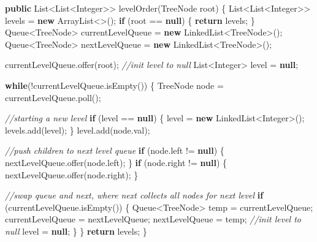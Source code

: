\documentclass[]{book}
\newenvironment{Shaded}{\begin{snugshade}}{\end{snugshade}}
\newcommand{\BuiltInTok}[1]{#1}
\newcommand{\CommentTok}[1]{\textcolor[rgb]{0.56,0.35,0.01}{\textit{#1}}}
\newcommand{\FunctionTok}[1]{\textcolor[rgb]{0.00,0.00,0.00}{#1}}
\newcommand{\KeywordTok}[1]{\textcolor[rgb]{0.13,0.29,0.53}{\textbf{#1}}}
\newcommand{\NormalTok}[1]{#1}
\begin{document}
\begin{Shaded}
\begin{Highlighting}[]
\KeywordTok{public} \BuiltInTok{List}\NormalTok{<}\BuiltInTok{List}\NormalTok{<}\BuiltInTok{Integer}\NormalTok{>> }\FunctionTok{levelOrder}\NormalTok{(}\BuiltInTok{TreeNode}\NormalTok{ root) \{}
    \BuiltInTok{List}\NormalTok{<}\BuiltInTok{List}\NormalTok{<}\BuiltInTok{Integer}\NormalTok{>> levels = }\KeywordTok{new} \BuiltInTok{ArrayList}\NormalTok{<>();}
    \KeywordTok{if}\NormalTok{ (root == }\KeywordTok{null}\NormalTok{) \{}
        \KeywordTok{return}\NormalTok{ levels;}
\NormalTok{    \}}
    \BuiltInTok{Queue}\NormalTok{<}\BuiltInTok{TreeNode}\NormalTok{> currentLevelQueue = }\KeywordTok{new} \BuiltInTok{LinkedList}\NormalTok{<}\BuiltInTok{TreeNode}\NormalTok{>();}
    \BuiltInTok{Queue}\NormalTok{<}\BuiltInTok{TreeNode}\NormalTok{> nextLevelQueue = }\KeywordTok{new} \BuiltInTok{LinkedList}\NormalTok{<}\BuiltInTok{TreeNode}\NormalTok{>();}

\NormalTok{    currentLevelQueue.}\FunctionTok{offer}\NormalTok{(root);}
    \CommentTok{//init level to null}
    \BuiltInTok{List}\NormalTok{<}\BuiltInTok{Integer}\NormalTok{> level = }\KeywordTok{null}\NormalTok{;}

    \KeywordTok{while}\NormalTok{(!currentLevelQueue.}\FunctionTok{isEmpty}\NormalTok{()) \{}
        \BuiltInTok{TreeNode}\NormalTok{ node = currentLevelQueue.}\FunctionTok{poll}\NormalTok{();}

        \CommentTok{//starting a new level}
        \KeywordTok{if}\NormalTok{ (level == }\KeywordTok{null}\NormalTok{) \{}
\NormalTok{            level = }\KeywordTok{new} \BuiltInTok{LinkedList}\NormalTok{<}\BuiltInTok{Integer}\NormalTok{>();}
\NormalTok{            levels.}\FunctionTok{add}\NormalTok{(level);}
\NormalTok{        \}}
\NormalTok{        level.}\FunctionTok{add}\NormalTok{(node.}\FunctionTok{val}\NormalTok{);}

        \CommentTok{//push children to next level queue}
        \KeywordTok{if}\NormalTok{ (node.}\FunctionTok{left}\NormalTok{ != }\KeywordTok{null}\NormalTok{) \{}
\NormalTok{            nextLevelQueue.}\FunctionTok{offer}\NormalTok{(node.}\FunctionTok{left}\NormalTok{);}
\NormalTok{        \}}
        \KeywordTok{if}\NormalTok{ (node.}\FunctionTok{right}\NormalTok{ != }\KeywordTok{null}\NormalTok{) \{}
\NormalTok{            nextLevelQueue.}\FunctionTok{offer}\NormalTok{(node.}\FunctionTok{right}\NormalTok{);}
\NormalTok{        \}}

        \CommentTok{//swap queue and next, where next collects all nodes for next level}
        \KeywordTok{if}\NormalTok{ (currentLevelQueue.}\FunctionTok{isEmpty}\NormalTok{()) \{}
            \BuiltInTok{Queue}\NormalTok{<}\BuiltInTok{TreeNode}\NormalTok{> temp = currentLevelQueue;}
\NormalTok{            currentLevelQueue = nextLevelQueue;}
\NormalTok{            nextLevelQueue = temp;}
            \CommentTok{//init level to null}
\NormalTok{            level = }\KeywordTok{null}\NormalTok{;}
\NormalTok{        \}}
\NormalTok{    \}}
    \KeywordTok{return}\NormalTok{ levels;}
\NormalTok{\}}
\end{Highlighting}
\end{Shaded}
\end{document}
